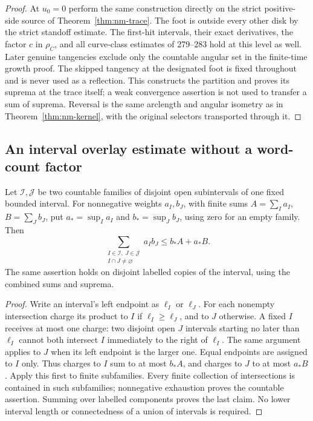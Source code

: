 \begin{proof}
At $u_0=0$ perform the same construction directly on the strict
positive-side source of Theorem~\ref{thm:nm-trace}.  The foot is
outside every other disk by the strict standoff estimate.  The
first-hit intervals, their exact derivatives, the factor $c$ in
$\rho_C$, and all curve-class estimates of 279--283 hold at this
level as well.  Later genuine tangencies exclude only the countable
angular set in the finite-time growth proof.  The skipped tangency
at the designated foot is fixed throughout and is never used as a
reflection.  This constructs the partition and proves its suprema
at the trace itself; a weak convergence assertion is not used to
transfer a sum of suprema.  Reversal is the same arclength and
angular isometry as in Theorem~\ref{thm:nm-kernel}, with the original
selectors transported through it.
\end{proof}

\subsection{An interval overlay estimate without a word-count factor}

\begin{lemma}
\label{lem:mb-overlay}
Let $\mathcal I,\mathcal J$ be two countable families of disjoint
open subintervals of one fixed bounded interval.  For nonnegative
weights $a_I,b_J$, with finite sums $A=\sum_Ia_I$, $B=\sum_Jb_J$,
put $a_*=\sup_Ia_I$ and $b_*=\sup_Jb_J$, using zero for an
empty family.  Then
\begin{equation}\label{eq:mb-overlay}
 \sum_{\substack{I\in\mathcal I,\ J\in\mathcal J\\I\cap J\ne\varnothing}}
                  a_Ib_J\le b_*A+a_*B .
\end{equation}
The same assertion holds on disjoint labelled copies of the interval,
using the combined sums and suprema.
\end{lemma}
\begin{proof}
Write an interval's left endpoint as $\ell_I$ or $\ell_J$.
For each nonempty intersection charge its product to $I$ if
$\ell_I\ge\ell_J$, and to $J$ otherwise.  A fixed $I$ receives
at most one charge: two disjoint open $J$ intervals starting no
later than $\ell_I$ cannot both intersect $I$ immediately to the
right of $\ell_I$.  The same argument applies to $J$ when its
left endpoint is the larger one.  Equal endpoints are assigned
to $I$ only.  Thus charges to $I$ sum to at most $b_*A$, and
charges to $J$ to at most $a_*B$.  Apply this first to finite
subfamilies.  Every finite collection of intersections is contained
in such subfamilies; nonnegative exhaustion proves the countable
assertion.  Summing over labelled components proves the last claim.
No lower interval length or connectedness of a union of intervals
is required.
\end{proof}

